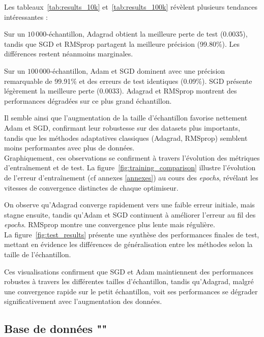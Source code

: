 \documentclass[a4paper,12pt]{article}
\begin{document}
\par Les tableaux~\ref{tab:results_10k} et~\ref{tab:results_100k} révèlent plusieurs tendances intéressantes : \\
\par Sur un $10\,000$-échantillon, Adagrad obtient la meilleure perte de test (0.0035), tandis que SGD et RMSprop partagent la meilleure précision (99.80\%). Les différences restent néanmoins marginales. \\
\par Sur un $100\,000$-échantillon, Adam et SGD dominent avec une précision remarquable de 99.91\% et des erreurs de test identiques (0.09\%). SGD présente légèrement la meilleure perte (0.0033). Adagrad et RMSprop montrent des performances dégradées sur ce plus grand échantillon.\\
\par Il semble ainsi que l'augmentation de la taille d'échantillon favorise nettement Adam et SGD, confirmant leur robustesse sur des datasets plus importants, tandis que les méthodes adaptatives classiques (Adagrad, RMSprop) semblent moins performantes avec plus de données.\\

Graphiquement, ces observations se confirment à travers l'évolution des métriques d'entraînement et de test. La figure~\ref{fig:training_comparison} illustre l'évolution de l'erreur d'entraînement (cf annexes \ref{annexes}) au cours des \textit{epochs}, révélant les vitesses de convergence distinctes de chaque optimiseur.\\
\par On observe qu'Adagrad converge rapidement vers une faible erreur initiale, mais stagne ensuite, tandis qu'Adam et SGD continuent à améliorer l'erreur au fil des \textit{epochs}. RMSprop montre une convergence plus lente mais régulière.\\

La figure~\ref{fig:test_results} présente une synthèse des performances finales de test, mettant en évidence les différences de généralisation entre les méthodes selon la taille de l'échantillon.\\
\par Ces visualisations confirment que SGD et Adam maintiennent des performances robustes à travers les différentes tailles d'échantillon, tandis qu'Adagrad, malgré une convergence rapide sur le petit échantillon, voit ses performances se dégrader significativement avec l'augmentation des données.

\subsection{Base de données ""}
\end{document}
